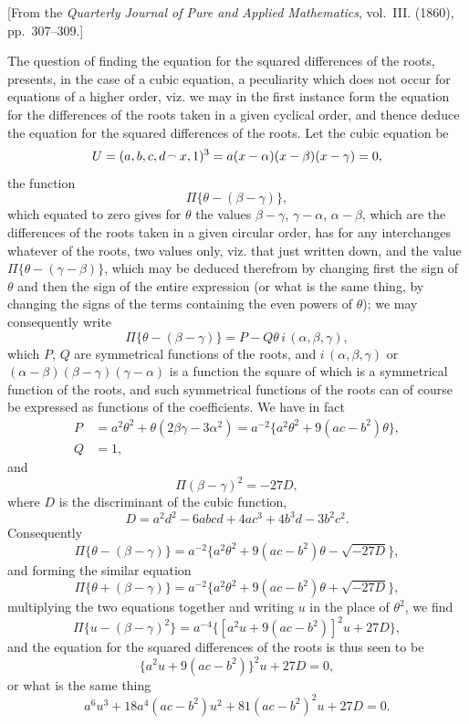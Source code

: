 \documentclass[11pt,a4paper]{article}
\theoremstyle{plain}
\begin{document}
[From the \textit{Quarterly Journal of Pure and Applied Mathematics}, vol.~III. (1860), pp.~307--309.]

The question of finding the equation for the squared differences of the roots, presents, in the case of a cubic equation, a peculiarity which does not occur for equations of a higher order, viz. we may in the first instance form the equation for the differences of the roots taken in a given cyclical order, and thence deduce the equation for the squared differences of the roots. Let the cubic equation be
\[
U = (a, b, c, d \mathbin{\vcenter{\hbox{$\scriptstyle\!\frown$}}} x, 1)^3 = a(x - \alpha)(x - \beta)(x - \gamma) = 0,
\]
the function
\[
\Pi\{\theta - (\beta - \gamma)\},
\]
which equated to zero gives for $\theta$ the values $\beta - \gamma$, $\gamma - \alpha$, $\alpha - \beta$, which are the differences of the roots taken in a given circular order, has for any interchanges whatever of the roots, two values only, viz. that just written down, and the value $\Pi\{\theta - (\gamma - \beta)\}$, which may be deduced therefrom by changing first the sign of $\theta$ and then the sign of the entire expression (or what is the same thing, by changing the signs of the terms containing the even powers of $\theta$); we may consequently write
\[
\Pi\{\theta - (\beta - \gamma)\} = P - Q\theta\, i\,(\alpha, \beta, \gamma),
\]
which $P$, $Q$ are symmetrical functions of the roots, and $i\,(\alpha, \beta, \gamma)$ or $(\alpha - \beta)(\beta - \gamma)(\gamma - \alpha)$ is a function the square of which is a symmetrical function of the roots, and such symmetrical functions of the roots can of course be expressed as functions of the coefficients. We have in fact
\begin{align*}
P &= a^2\theta^2 + \theta(2\beta\gamma - 3\alpha^2) = a^{-2}\{a^2\theta^2 + 9(ac - b^2)\theta\},\\
Q &= 1,
\end{align*}
and
\[
\Pi(\beta - \gamma)^2 = -27D,
\]
where $D$ is the discriminant of the cubic function,
\[
D = a^2d^2 - 6abcd + 4ac^3 + 4b^3d - 3b^2c^2.
\]
Consequently
\[
\Pi\{\theta - (\beta - \gamma)\} = a^{-2}\{a^2\theta^2 + 9(ac - b^2)\theta - \sqrt{-27D}\},
\]
and forming the similar equation
\[
\Pi\{\theta + (\beta - \gamma)\} = a^{-2}\{a^2\theta^2 + 9(ac - b^2)\theta + \sqrt{-27D}\},
\]
multiplying the two equations together and writing $u$ in the place of $\theta^2$, we find
\[
\Pi\{u - (\beta - \gamma)^2\} = a^{-4}\{[a^2u + 9(ac - b^2)]^2u + 27D\},
\]
and the equation for the squared differences of the roots is thus seen to be
\[
\{a^2u + 9(ac - b^2)\}^2u + 27D = 0,
\]
or what is the same thing
\[
a^6u^3 + 18a^4(ac - b^2)u^2 + 81(ac - b^2)^2u + 27D = 0.
\]
\end{document}
